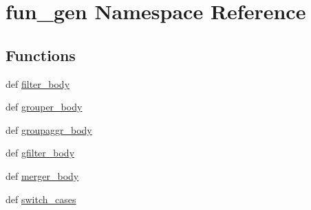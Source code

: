 \hypertarget{namespacefun__gen}{\section{fun\-\_\-gen \-Namespace \-Reference}
\label{namespacefun__gen}
}
\subsection*{\-Functions}
\begin{DoxyCompactItemize}
\item 
def \hyperlink{namespacefun__gen_a61a94a55994d4646e00b38ca77db4b61}{filter\-\_\-body}
\item 
def \hyperlink{namespacefun__gen_af701bf481b8c50cf36062b91d0059cf7}{grouper\-\_\-body}
\item 
def \hyperlink{namespacefun__gen_ab9d83814c07cea2f7b79b84210c52cc7}{groupaggr\-\_\-body}
\item 
def \hyperlink{namespacefun__gen_a4e976e87c1e7c326e1befa11a8d26a44}{gfilter\-\_\-body}
\item 
def \hyperlink{namespacefun__gen_ac739eab321bbc8f1a6e257754772409c}{merger\-\_\-body}
\item 
def \hyperlink{namespacefun__gen_a0820d7a5d4a6756120f938f26520b49d}{switch\-\_\-cases}
\end{DoxyCompactItemize}
